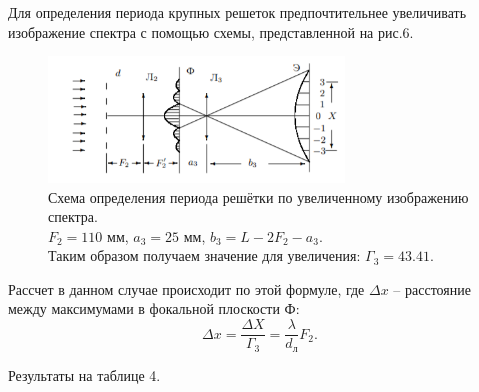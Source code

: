 \documentclass[a4paper, 14pt]{extarticle}%
\newcommand\ECaption[1]{%
     \captionsetup{font=footnotesize}%
     \caption{#1}}
\begin{document}
Для определения периода крупных решеток предпочтительнее увеличивать изображение спектра с помощью схемы, представленной на рис.6.
\begin{figure}[h!]
\begin{center}
\includegraphics[width=0.7\textwidth]{ust3}
\ECaption{Схема определения периода решётки по увеличенному
изображению спектра. \\
$F_2 = 110$ мм, $a_3 = 25$ мм, $b_3 = L - 2F_2 - a_3$. \\ Таким образом получаем значение для увеличения: $\Gamma_3 = 43.41$. }
\end{center}
\end{figure}

Рассчет в данном случае происходит по этой формуле, где $\Delta x$ -- расстояние между максимумами в фокальной плоскости Ф:
\[\Delta x = \frac{\Delta X}{\Gamma_3} = \frac{\lambda}{d_{\text{л}}}F_2.\]

Результаты на таблице 4. 
\newpage
\end{document}
